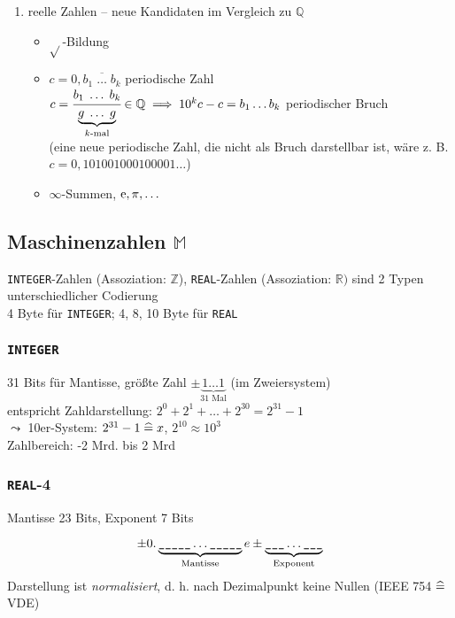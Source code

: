 \begin{enumerate}
 \item reelle Zahlen -- neue Kandidaten im Vergleich zu $\mathbb{Q}$
\begin{itemize}
 \item $\sqrt{}$-Bildung
 \item $c = 0,\overline{b_1 \;\ldots\; b_k}$ periodische Zahl\\
$c = \cfrac{b_1 \;\ldots\; b_k}{\underbrace{g \;\ldots\; g}_{k\text{-mal}}} \in \mathbb{Q} \implies 10^k c -c = b_1 \ldots b_k$ periodischer Bruch\\
(eine neue periodische Zahl, die nicht als Bruch darstellbar ist, wäre z. B. $c=0,101001000100001\ldots$)
 \item $\infty$-Summen, $\operatorname{e}, \pi,\ldots$
\end{itemize}

\end{enumerate}

\subsection{Maschinenzahlen $\mathbb{M}$}

\begingroup
\newcommand{\integer}{\texttt{INTEGER}}
\newcommand{\real}{\texttt{REAL}}

\integer-Zahlen (Assoziation: $\mathbb{Z}$), \real-Zahlen (Assoziation: $\mathbb{R})$ sind 2 Typen unterschiedlicher Codierung\\
4 Byte für \integer; 4, 8, 10 Byte für \real

\subsubsection*{\integer}

31 Bits für Mantisse, größte Zahl $\pm \underbrace{1\ldots1}_{31\text{ Mal}}$ (im Zweiersystem)\\
entspricht Zahldarstellung: $2^0+2^1+\ldots+2^{30}=2^{31}-1$ \\
$\leadsto$ 10er-System: $2^{31}-1 \mathrel{\widehat{=}} x$, $2^{10}\approx 10^3$\\
Zahlbereich: -2 Mrd. bis 2 Mrd

\subsubsection*{\real-4}

Mantisse 23 Bits, Exponent 7 Bits

\begin{equation*}
\pm 0.\underbrace{\text{\ttfamily\_\_\_\_\_}\ldots\text{\ttfamily\_\_\_\_\_}}_{\text{Mantisse}}e\pm\underbrace{\text{\ttfamily\_\_\_}\ldots\text{\ttfamily\_\_\_}}_{\text{Exponent}}
\end{equation*}
Darstellung ist \emph{normalisiert}, d. h. nach Dezimalpunkt keine Nullen (IEEE 754 $\mathrel{\widehat{=}}$ VDE)

